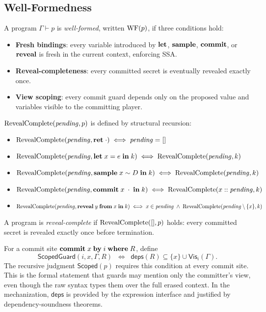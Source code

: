\documentclass[11pt]{article}
\begin{document}
\subsection{Well-Formedness}\label{sec:wf}

\begin{definition}\label{def:wf}
A program $\Gamma \vdash p$ is \emph{well-formed}, written $\mathrm{WF}(p)$, if three
conditions hold:
\begin{itemize}[nosep]
\item \textbf{Fresh bindings}: every variable introduced by $\mathbf{let}$, $\mathbf{sample}$,
      $\mathbf{commit}$, or $\mathbf{reveal}$ is fresh in the current context, enforcing SSA.
\item \textbf{Reveal-completeness}: every committed secret is eventually
      revealed exactly once.
\item \textbf{View scoping}: every commit guard depends only on the proposed
      value and variables visible to the committing player.
\end{itemize}
\end{definition}

\begin{definition}\label{def:revealcomplete}
$\mathrm{RevealComplete}(\mathit{pending}, p)$ is defined by structural recursion:
\begin{itemize}[nosep]
\item $\mathrm{RevealComplete}(\mathit{pending}, \mathbf{ret}\;\cdot) \iff
      \mathit{pending} = []$
\item $\mathrm{RevealComplete}(\mathit{pending}, \mathbf{let}\;x = e\;\mathbf{in}\;k) \iff
      \mathrm{RevealComplete}(\mathit{pending}, k)$
\item $\mathrm{RevealComplete}(\mathit{pending}, \mathbf{sample}\;x \sim D\;\mathbf{in}\;k) \iff
      \mathrm{RevealComplete}(\mathit{pending}, k)$
\item $\mathrm{RevealComplete}(\mathit{pending}, \mathbf{commit}\;x\;\cdot\;\mathbf{in}\;k) \iff
      \mathrm{RevealComplete}(x :: \mathit{pending}, k)$
\item $\mathrm{RevealComplete}(\mathit{pending}, \mathbf{reveal}\;y\;\mathbf{from}\;x\;\mathbf{in}\;k) \iff
      x \in \mathit{pending} \;\wedge\;
      \mathrm{RevealComplete}(\mathit{pending} \setminus \{x\}, k)$
\end{itemize}
A program is \emph{reveal-complete} if $\mathrm{RevealComplete}([], p)$ holds: every
committed secret is revealed exactly once before termination.
\end{definition}

\begin{definition}\label{def:viewscoped}
For a commit site $\mathbf{commit}\;x\;\mathbf{by}\;i\;\mathbf{where}\;R$, define
\[
  \mathsf{ScopedGuard}(i, x, \Gamma, R)
  \;\;\iff\;\;
  \mathsf{deps}(R) \subseteq \{x\} \cup \mathsf{Vis}_i(\Gamma).
\]
The recursive judgment $\mathsf{Scoped}(p)$ requires this condition at every
commit site. This is the formal statement that guards may mention only the
committer's view, even though the raw syntax types them over the full erased
context. In the mechanization, $\mathsf{deps}$ is provided by the expression
interface and justified by dependency-soundness theorems.
\end{definition}
\end{document}
